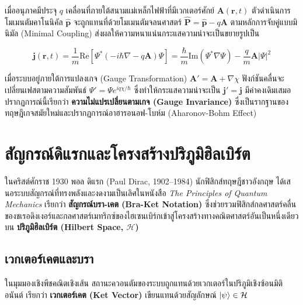 เมื่ออนุภาคมีประจุ $q$ เคลื่อนที่ภายใต้สนามแม่เหล็กไฟฟ้าที่มีเวกเตอร์ศักย์ $\mathbf{A}(\mathbf{r}, t)$ ตัวดำเนินการโมเมนตัมคาโนนิคัล $\hat{\mathbf{p}}$ จะถูกแทนที่ด้วยโมเมนตัมจลนศาสตร์ $\hat{\mathbf{P}} = \hat{\mathbf{p}} - q\mathbf{A}$ ตามหลักการจับคู่แบบมินิมัล (Minimal Coupling) ส่งผลให้ความหนาแน่นกระแสความน่าจะเป็นขยายรูปเป็น

\begin{equation}
\mathbf{j}(\mathbf{r}, t) = \frac{1}{m} \text{Re}\left[ \Psi^* \left( -i\hbar\nabla - q\mathbf{A} \right) \Psi \right] = \frac{\hbar}{m}\text{Im}(\Psi^*\nabla\Psi) - \frac{q}{m}\mathbf{A}|\Psi|^2
\label{eq:prob_current_gauge}
\end{equation}

เมื่อระบบอยู่ภายใต้การแปลงเกจ (Gauge Transformation) $\mathbf{A}' = \mathbf{A} + \nabla \chi$ ฟังก์ชันคลื่นจะเปลี่ยนเฟสตามความสัมพันธ์ $\Psi' = \Psi e^{i q\chi / \hbar}$ ซึ่งทำให้กระแสความน่าจะเป็น $\mathbf{j}' = \mathbf{j}$ มีค่าคงเดิมเสมอ ปรากฏการณ์นี้เรียกว่า \textbf{ความไม่แปรเปลี่ยนตามเกจ (Gauge Invariance)} ซึ่งเป็นรากฐานของทฤษฎีเกจสมัยใหม่และปรากฏการณ์อาฮารอนอฟ-โบห์ม (Aharonov-Bohm Effect)

\section{สัญกรณ์ดิแรกและโครงสร้างปริภูมิฮิลเบิร์ต}

ในคริสต์ศักราช 1930 พอล ดิแรก (Paul Dirac, 1902--1984) นักฟิสิกส์ทฤษฎีชาวอังกฤษ ได้เสนอระบบสัญกรณ์ที่ทรงพลังและงดงามเป็นเลิศในหนังสือ \textit{The Principles of Quantum Mechanics} เรียกว่า \textbf{สัญกรณ์บรา-เคต (Bra-Ket Notation)} ซึ่งช่วยรวมฟิสิกส์กลศาสตร์คลื่นของชเรอดิงเงอร์และกลศาสตร์เมทริกซ์ของไฮเซนเบิร์กเข้าสู่โครงสร้างทางคณิตศาสตร์อันเป็นหนึ่งเดียวบน \textbf{ปริภูมิฮิลเบิร์ต (Hilbert Space, $\mathcal{H}$)}

\subsection{เวกเตอร์เคตและบรา}
ในมุมมองเชิงพีชคณิตเชิงเส้น สถานะควอนตัมของระบบถูกแทนด้วยเวกเตอร์ในปริภูมิเชิงซ้อนมิติอนันต์ เรียกว่า \textbf{เวกเตอร์เคต (Ket Vector)} เขียนแทนด้วยสัญลักษณ์ $\ket{\psi} \in \mathcal{H}$ 

